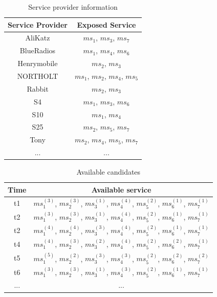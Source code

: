\documentclass[10pt,journal,compsoc]{IEEEtran}
\begin{document}
\begin{table}[!t]
\renewcommand{\arraystretch}{1.3}
\caption{Service provider information}
\label{table_example}
\centering
\begin{tabular}{|c||c|}
\hline
\bfseries Service Provider & \bfseries Exposed Service\\
\hline
\hline
AliKatz     & $ms_1$, $ms_3$, $ms_7$\\
\hline 
BlueRadios  & $ms_1$, $ms_4$, $ms_6$\\
\hline
Henrymobile & $ms_2$, $ms_3$\\
\hline
NORTHOLT    & $ms_1$, $ms_2$, $ms_4$, $ms_5$ \\
\hline
Rabbit      & $ms_2$, $ms_3$\\
\hline 
S4          & $ms_1$, $ms_3$, $ms_6$\\
\hline 
S10         & $ms_1$, $ms_4$\\
\hline 
S25         & $ms_2$, $ms_5$, $ms_7$\\
\hline 
Tony        & $ms_2$, $ms_4$, $ms_5$, $ms_7$\\
\hline 
... & ...\\
\hline
\end{tabular}
\end{table}

\begin{table}[!t]
\renewcommand{\arraystretch}{1.3}
\caption{Available candidates}
\label{table_example}
\centering
\begin{tabular}{|c||c|}
\hline
\bfseries Time & \bfseries Available service\\
\hline
\hline
t1     & $ms_1^{(3)}$, $ms_2^{(3)}$, $ms_3^{(1)}$, $ms_4^{(4)}$, $ms_5^{(2)}$, $ms_6^{(1)}$, $ms_7^{(1)}$\\
\hline 
t2     & $ms_1^{(3)}$, $ms_2^{(3)}$, $ms_3^{(1)}$, $ms_4^{(4)}$, $ms_5^{(2)}$, $ms_6^{(1)}$, $ms_7^{(1)}$\\
\hline
t2     & $ms_1^{(4)}$, $ms_2^{(4)}$, $ms_3^{(3)}$, $ms_4^{(4)}$, $ms_5^{(2)}$, $ms_6^{(1)}$, $ms_7^{(1)}$\\
\hline
t4     & $ms_1^{(4)}$, $ms_2^{(3)}$, $ms_3^{(2)}$, $ms_4^{(4)}$, $ms_5^{(2)}$, $ms_6^{(2)}$, $ms_7^{(1)}$\\
\hline
t5     & $ms_1^{(5)}$, $ms_2^{(2)}$, $ms_3^{(3)}$, $ms_4^{(3)}$, $ms_5^{(2)}$, $ms_6^{(2)}$, $ms_7^{(2)}$\\
\hline 
t6     & $ms_1^{(3)}$, $ms_2^{(3)}$, $ms_3^{(1)}$, $ms_4^{(3)}$, $ms_5^{(2)}$, $ms_6^{(1)}$, $ms_7^{(1)}$\\
\hline 
... & ...\\
\hline
\end{tabular}
\end{table}
\end{document}
